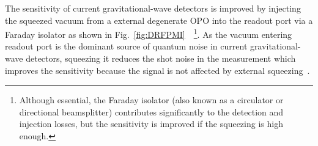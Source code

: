 The sensitivity of current gravitational-wave detectors is improved by injecting the squeezed vacuum from a external degenerate OPO into the readout port via a Faraday isolator as shown in Fig.~\ref{fig:DRFPMI}~\cite{aasietal2013}~\footnote{Although essential, the Faraday isolator (also known as a circulator or directional beamsplitter) contributes significantly to the detection and injection losses, but the sensitivity is improved if the squeezing is high enough.}.
As the vacuum entering readout port is the dominant source of quantum noise in current gravitational-wave detectors, squeezing it reduces the shot noise in the measurement which improves the sensitivity because the signal is not affected by external squeezing~\cite{tseQuantumEnhancedAdvancedLIGO2019}.
